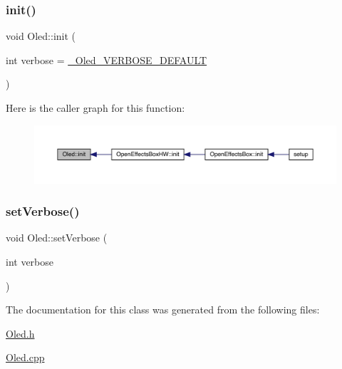 \subsubsection{\texorpdfstring{init()}{init()}}
{\footnotesize\ttfamily void Oled\+::init (\begin{DoxyParamCaption}\item[{int}]{verbose = {\ttfamily \mbox{\hyperlink{_oled_8h_a709eafcdb5f29b4e09e40afd3797bf1f}{\+\_\+\+Oled\+\_\+\+V\+E\+R\+B\+O\+S\+E\+\_\+\+D\+E\+F\+A\+U\+LT}}} }\end{DoxyParamCaption})}

Here is the caller graph for this function\+:\nopagebreak
\begin{figure}[H]
\begin{center}
\leavevmode
\includegraphics[width=350pt]{class_oled_a36f0818a7144c6983ae765a7a0659a70_icgraph}
\end{center}
\end{figure}
\mbox{\label{class_oled_ac98607fd013045f3e1b2d015cc1ddb73}} 
\subsubsection{\texorpdfstring{set\+Verbose()}{setVerbose()}}
{\footnotesize\ttfamily void Oled\+::set\+Verbose (\begin{DoxyParamCaption}\item[{int}]{verbose }\end{DoxyParamCaption})}



The documentation for this class was generated from the following files\+:\begin{DoxyCompactItemize}
\item 
\mbox{\hyperlink{_oled_8h}{Oled.\+h}}\item 
\mbox{\hyperlink{_oled_8cpp}{Oled.\+cpp}}\end{DoxyCompactItemize}
